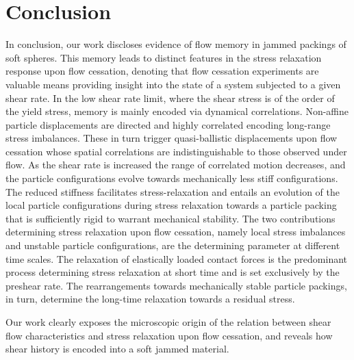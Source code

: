 \documentclass[%
preprint,
 amsmath,amssymb,
 aps,
]{revtex4-1}
\begin{document}
{{\section{Conclusion}

In conclusion, our work discloses evidence of flow memory in jammed packings of soft spheres. This memory leads to distinct features in the stress relaxation response upon flow cessation, denoting that flow cessation experiments are valuable means providing insight into the state of a system
subjected to a given shear rate. In the low shear rate limit, where the shear stress is of the order of the yield stress, memory is mainly encoded via dynamical correlations. Non-affine particle displacements are directed and highly correlated encoding long-range stress imbalances. These in turn trigger quasi-ballistic displacements upon flow cessation whose spatial correlations are indistinguishable to those observed under flow. As the shear rate is increased the range of correlated motion decreases, and the particle configurations evolve towards mechanically less stiff configurations. The reduced stiffness facilitates stress-relaxation and entails an evolution of the local particle configurations during stress relaxation towards a particle packing that is sufficiently rigid to warrant mechanical stability. The two contributions determining stress relaxation upon flow cessation, namely local stress imbalances and unstable particle configurations, are the determining parameter at different time scales. The relaxation of elastically loaded contact forces is the predominant process determining stress relaxation at short time and is set exclusively by the preshear rate. The rearrangements towards mechanically stable particle packings, in turn, determine the long-time relaxation towards a residual stress. 

Our work clearly exposes the microscopic origin of the relation between shear flow characteristics and stress relaxation upon flow cessation, and reveals how shear history is encoded into a soft jammed material.           

}}
\end{document}
